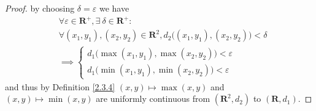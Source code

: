 \begin{proof}
    by choosing \(\delta = \varepsilon\) we have
    \begin{align*}
         & \forall \varepsilon \in \mathbf{R}^+, \exists\ \delta \in \mathbf{R}^+ :                      \\
         & \forall (x_1, y_1), (x_2, y_2) \in \mathbf{R}^2, d_2\big((x_1, y_1), (x_2, y_2)\big) < \delta \\
         & \implies \begin{cases}
                        d_1\big(\max(x_1, y_1), \max(x_2, y_2)\big) < \varepsilon \\
                        d_1\big(\min(x_1, y_1), \min(x_2, y_2)\big) < \varepsilon
                    \end{cases}
    \end{align*}
    and thus by Definition \ref{2.3.4} \((x, y) \mapsto \max(x, y)\) and \((x, y) \mapsto \min(x, y)\) are uniformly continuous from \((\mathbf{R}^2, d_2)\) to \((\mathbf{R}, d_1)\).


\end{proof}
